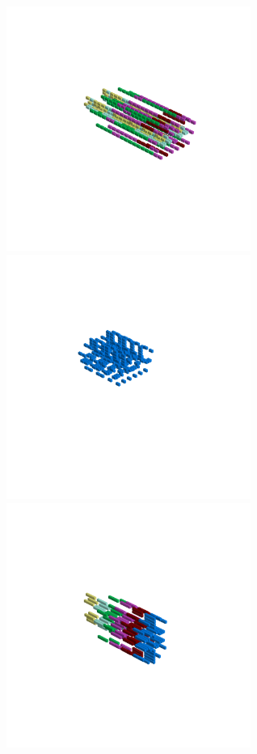 \begin{minipage}[b]{0.50\linewidth}                                       
  \begin{figure}[H]
      \centering
        \vspace*{-1cm}
        \hspace*{-2cm}
        \includegraphics[width=8cm]{src/symmetries/pattern9_1-45.png}%
        \hspace*{-4cm}
        \includegraphics[width=8cm]{src/symmetries/pattern9_2-45.png}\\
        \vspace*{-5cm}
        \hspace*{-1cm}
        \includegraphics[width=8cm]{src/symmetries/pattern9_3-45.png}\\

\end{figure}
\end{minipage}
